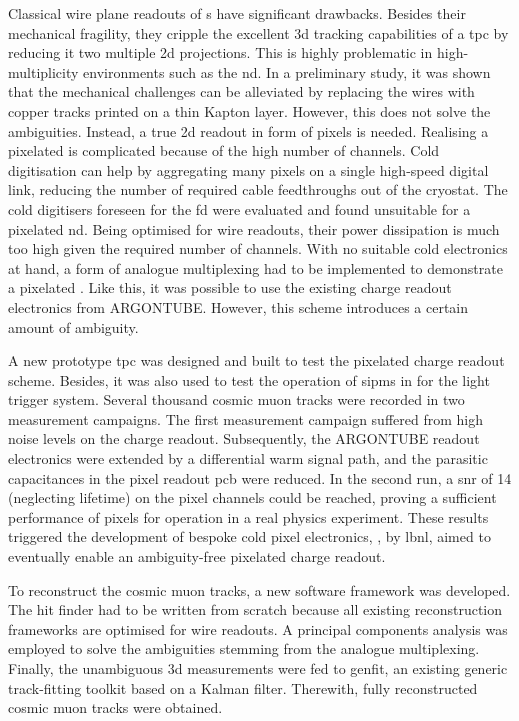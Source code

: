 Classical wire plane readouts of \lartpc{}s have significant drawbacks.
Besides their mechanical fragility, they cripple the excellent \gls{3d} tracking capabilities of a \gls{tpc} by reducing it two multiple \gls{2d} projections.
This is highly problematic in high-multiplicity environments such as the \dune{} \gls{nd}.
In a preliminary study, it was shown that the mechanical challenges can be alleviated by replacing the wires with copper tracks printed on a thin Kapton layer.
However, this does not solve the ambiguities.
Instead, a true \gls{2d} readout in form of pixels is needed.
Realising a pixelated \lartpc{} is complicated because of the high number of channels.
Cold digitisation can help by aggregating many pixels on a single high-speed digital link, reducing the number of required cable feedthroughs out of the cryostat.
The cold digitisers foreseen for the \dune{} \gls{fd} were evaluated and found unsuitable for a pixelated \gls{nd}.
Being optimised for wire readouts, their power dissipation is much too high given the required number of channels.
With no suitable cold electronics at hand, a form of analogue multiplexing had to be implemented to demonstrate a pixelated \lartpc{}.
Like this, it was possible to use the existing charge readout electronics from ARGONTUBE.
However, this scheme introduces a certain amount of ambiguity.

A new prototype \gls{tpc} was designed and built to test the pixelated charge readout scheme.
Besides, it was also used to test the operation of \glspl{sipm} in \lar{} for the light trigger system.
Several thousand cosmic muon tracks were recorded in two measurement campaigns.
The first measurement campaign suffered from high noise levels on the charge readout.
Subsequently, the ARGONTUBE readout electronics were extended by a differential warm signal path, and the parasitic capacitances in the pixel readout \gls{pcb} were reduced.
In the second run, a \gls{snr} of \num{14} (neglecting lifetime) on the pixel channels could be reached, proving a sufficient performance of pixels for operation in a real physics experiment.
These results triggered the development of bespoke cold pixel electronics, \larpix{}, by \gls{lbnl}, aimed to eventually enable an ambiguity-free pixelated \lartpc{} charge readout.

To reconstruct the cosmic muon tracks, a new software framework was developed.
The hit finder had to be written from scratch because all existing \lartpc{} reconstruction frameworks are optimised for wire readouts.
A principal components analysis was employed to solve the ambiguities stemming from the analogue multiplexing.
Finally, the unambiguous \gls{3d} measurements were fed to \gls{genfit}, an existing generic track-fitting toolkit based on a Kalman filter.
Therewith, fully reconstructed cosmic muon tracks were obtained.

